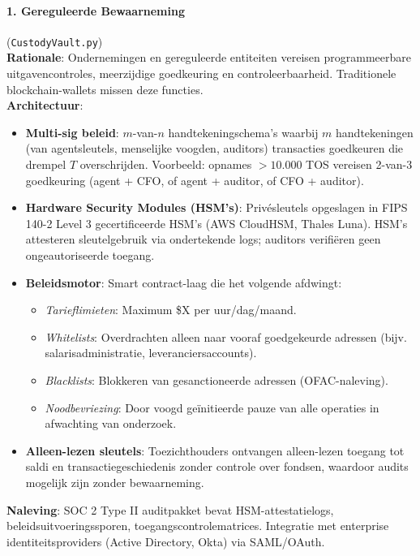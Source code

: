 \documentclass[11pt]{article}
\begin{document}
\paragraph{1. Gereguleerde Bewaarneming} (\texttt{CustodyVault.py})\\
\textbf{Rationale}: Ondernemingen en gereguleerde entiteiten vereisen programmeerbare uitgavencontroles, meerzijdige goedkeuring en controleerbaarheid. Traditionele blockchain-wallets missen deze functies.\\
\textbf{Architectuur}:
\begin{itemize}[noitemsep]
  \item \textbf{Multi-sig beleid}: $m$-van-$n$ handtekeningschema's waarbij $m$ handtekeningen (van agentsleutels, menselijke voogden, auditors) transacties goedkeuren die drempel $T$ overschrijden. Voorbeeld: opnames $>10.000$ TOS vereisen 2-van-3 goedkeuring (agent + CFO, of agent + auditor, of CFO + auditor).
  \item \textbf{Hardware Security Modules (HSM's)}: Privésleutels opgeslagen in FIPS 140-2 Level 3 gecertificeerde HSM's (AWS CloudHSM, Thales Luna). HSM's attesteren sleutelgebruik via ondertekende logs; auditors verifiëren geen ongeautoriseerde toegang.
  \item \textbf{Beleidsmotor}: Smart contract-laag die het volgende afdwingt:
    \begin{itemize}[noitemsep]
      \item \emph{Tarieflimieten}: Maximum \$X per uur/dag/maand.
      \item \emph{Whitelists}: Overdrachten alleen naar vooraf goedgekeurde adressen (bijv. salarisadministratie, leveranciersaccounts).
      \item \emph{Blacklists}: Blokkeren van gesanctioneerde adressen (OFAC-naleving).
      \item \emph{Noodbevriezing}: Door voogd geïnitieerde pauze van alle operaties in afwachting van onderzoek.
    \end{itemize}
  \item \textbf{Alleen-lezen sleutels}: Toezichthouders ontvangen alleen-lezen toegang tot saldi en transactiegeschiedenis zonder controle over fondsen, waardoor audits mogelijk zijn zonder bewaarneming.
\end{itemize}
\textbf{Naleving}: SOC 2 Type II auditpakket bevat HSM-attestatielogs, beleidsuitvoeringssporen, toegangscontrolematrices. Integratie met enterprise identiteitsproviders (Active Directory, Okta) via SAML/OAuth.
\end{document}

